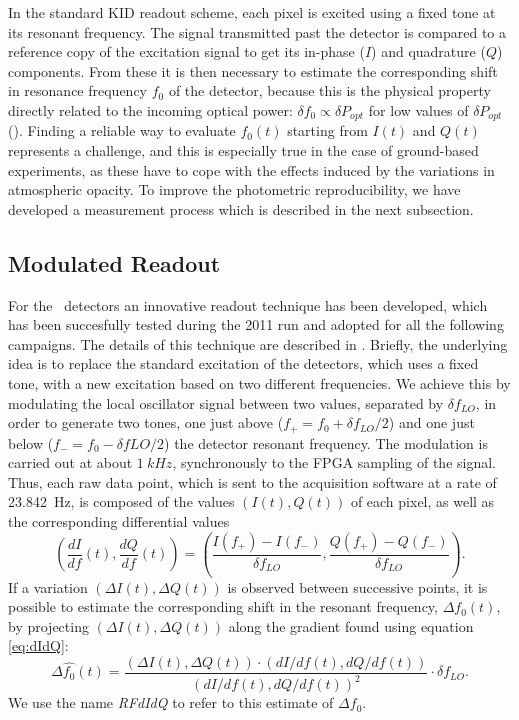 
In the standard KID readout scheme, each pixel is excited using a fixed tone at its resonant frequency. The signal transmitted past the detector is compared to a reference copy of the excitation signal to get its in-phase ($I$) and quadrature ($Q$) components. From these it is then necessary to estimate the corresponding shift in resonance frequency $f_0$ of the detector, because this is the physical property directly related to the incoming optical power: $\delta f_0 \propto \delta P_{opt} $ for low values of $\delta P_{opt} $ (\cite{Swenson2010}).
Finding a reliable way to evaluate $f_0(t)$ starting from $I(t)$ and $Q(t)$ represents a challenge, and this is especially true in the case of ground-based experiments, as these have to cope with the effects induced by the variations in atmospheric opacity. To improve the photometric reproducibility, we have developed a measurement process which is described in the next subsection.

\subsection{Modulated Readout}\label{REU}
\label{sec:rfdidq}

For the \NIKA\ detectors an innovative readout technique has been developed, which has been succesfully tested during the 2011 run and adopted for all the following campaigns. The details of this technique are described in \cite{Calvo2013}. Briefly, the underlying idea is to replace the standard excitation of the detectors, which uses a fixed tone, with a new excitation based on two different frequencies. We achieve this by modulating the local oscillator signal between two values, separated by $\delta f_{LO}$, in order to generate two tones, one just above ($f_+ = f_0 + \delta f_{LO}/2$) and one just below ($f_- = f_0 - \delta f{LO}/2$) the detector resonant frequency. The modulation is carried out at about $1~kHz$, synchronously to the FPGA sampling of the signal. Thus, each raw data point, which is sent to the acquisition software at a rate of 23.842~Hz, is composed of the values $(I(t), Q(t))$ of each pixel, as well as the corresponding differential values
\begin{equation}
\left(\frac{dI}{df}(t), \frac{dQ}{df}(t)\right) = \left(\frac{I(f_+)-I(f_-)}{\delta f_{LO}}, \frac{Q(f_+)-Q(f_-)}{\delta f_{LO}}\right).
\label{eq:dIdQ}
\end{equation}
If a variation $(\Delta I(t), \Delta Q(t))$ is observed between successive points, it is possible to estimate the corresponding shift in the resonant frequency, $\Delta f_0(t)$, by projecting $(\Delta I(t), \Delta Q(t))$ along the gradient found using equation \ref{eq:dIdQ}:
\begin{equation}
\Delta \hat{f_{0}}(t) = \frac{\left(\Delta I(t), \Delta Q(t)\right)\cdot\left(dI/df(t), dQ/df(t)\right)}{\left(dI/df(t), dQ/df(t)\right)^2}\cdot\delta f_{LO}.
\label{eq:RFdIdQ}
\end{equation}
We use the name \emph{RFdIdQ} to refer to this estimate of $\Delta f_0$.


